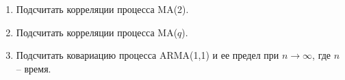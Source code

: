 \documentclass[a4paper,12pt]{extreport}
\renewcommand{\=}[1]{\stackrel{#1}{=}} %
\newcommand{\Expect}{\mathop{{}\mathrm{E}}}
\begin{document}
\begin{enumerate}


    \item Подсчитать корреляции процесса MA(2). 
    \item Подсчитать корреляции процесса MA($q$). 



    \item Подсчитать ковариацию процесса ARMA(1,1) и ее предел при $n \to \infty$,
    где $n$ -- время.



\end{enumerate}
\end{document}
